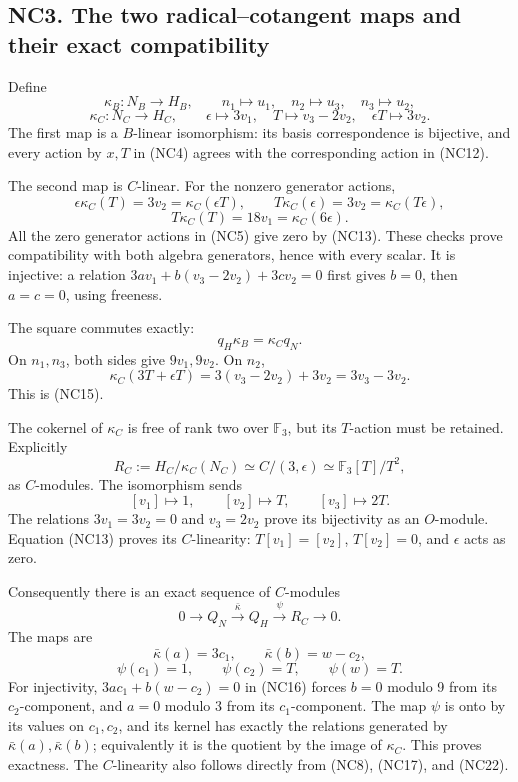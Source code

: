 \documentclass[
]{article}
\begin{document}
\subsection{NC3. The two radical--cotangent maps and their exact
compatibility}\label{nc3.-the-two-radicalcotangent-maps-and-their-exact-compatibility}

Define \[
\kappa_B:N_B\longrightarrow H_B,\qquad
n_1\longmapsto u_1,\quad n_2\longmapsto u_3,\quad n_3\longmapsto u_2,
\] \[
\kappa_C:N_C\longrightarrow H_C,\qquad
\epsilon\longmapsto3v_1,\quad
T\longmapsto v_3-2v_2,\quad
\epsilon T\longmapsto3v_2.
\tag{NC18}
\] The first map is a \(B\)-linear isomorphism: its basis correspondence
is bijective, and every action by \(x,T\) in (NC4) agrees with the
corresponding action in (NC12).

The second map is \(C\)-linear. For the nonzero generator actions, \[
\epsilon\kappa_C(T)=3v_2=\kappa_C(\epsilon T),\qquad
T\kappa_C(\epsilon)=3v_2=\kappa_C(T\epsilon),
\] \[
T\kappa_C(T)=18v_1=\kappa_C(6\epsilon).
\] All the zero generator actions in (NC5) give zero by (NC13). These
checks prove compatibility with both algebra generators, hence with
every scalar. It is injective: a relation \(3av_1+b(v_3-2v_2)+3cv_2=0\)
first gives \(b=0\), then \(a=c=0\), using freeness.

The square commutes exactly: \[
q_H\kappa_B=\kappa_Cq_N.
\tag{NC19}
\] On \(n_1,n_3\), both sides give \(9v_1,9v_2\). On \(n_2\), \[
\kappa_C(3T+\epsilon T)=3(v_3-2v_2)+3v_2=3v_3-3v_2.
\] This is (NC15).

The cokernel of \(\kappa_C\) is free of rank two over \(\mathbb F_3\),
but its \(T\)-action must be retained. Explicitly \[
R_C:=H_C/\kappa_C(N_C)\simeq C/(3,\epsilon)
\simeq\mathbb F_3[T]/T^2,
\tag{NC20}
\] as \(C\)-modules. The isomorphism sends \[
[v_1]\longmapsto1,\qquad[v_2]\longmapsto T,\qquad
[v_3]\longmapsto2T.
\] The relations \(3v_1=3v_2=0\) and \(v_3=2v_2\) prove its bijectivity
as an \(O\)-module. Equation (NC13) proves its \(C\)-linearity:
\(T[v_1]=[v_2]\), \(T[v_2]=0\), and \(\epsilon\) acts as zero.

Consequently there is an exact sequence of \(C\)-modules \[
0\longrightarrow Q_N\xrightarrow{\bar\kappa}Q_H
\xrightarrow{\psi}R_C\longrightarrow0.
\tag{NC21}
\] The maps are \[
\bar\kappa(a)=3c_1,\qquad
\bar\kappa(b)=w-c_2,
\] \[
\psi(c_1)=1,\qquad\psi(c_2)=T,\qquad\psi(w)=T.
\tag{NC22}
\] For injectivity, \(3ac_1+b(w-c_2)=0\) in (NC16) forces \(b=0\) modulo
9 from its \(c_2\)-component, and \(a=0\) modulo 3 from its
\(c_1\)-component. The map \(\psi\) is onto by its values on
\(c_1,c_2\), and its kernel has exactly the relations generated by
\(\bar\kappa(a),\bar\kappa(b)\); equivalently it is the quotient by the
image of \(\kappa_C\). This proves exactness. The \(C\)-linearity also
follows directly from (NC8), (NC17), and (NC22).
\end{document}
